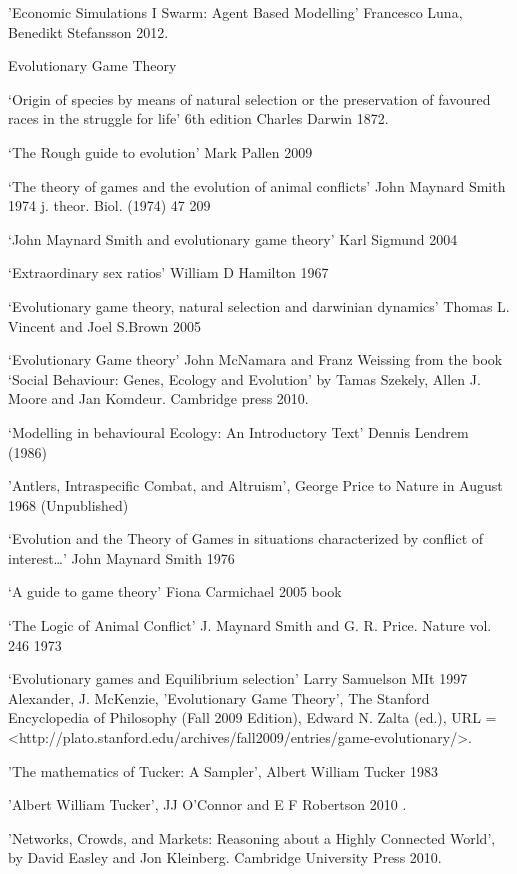 \documentclass{article}
\begin{document}
'Economic Simulations I Swarm: Agent Based Modelling' Francesco Luna, Benedikt Stefansson 2012.


Evolutionary Game Theory

‘Origin of species by means of natural selection or the preservation of favoured races in the struggle for life’ 6th edition Charles
Darwin 1872.

‘The Rough guide to evolution’ Mark Pallen 2009

‘The theory of games and the evolution of animal conflicts’ John Maynard Smith 1974 j. theor. Biol. (1974) 47  209

‘John Maynard Smith and evolutionary game theory’ Karl Sigmund 2004

‘Extraordinary sex ratios’ William D Hamilton 1967

‘Evolutionary game theory, natural selection and darwinian dynamics’ Thomas L. Vincent and Joel S.Brown 2005

‘Evolutionary Game theory’ John McNamara and Franz Weissing from the book ‘Social Behaviour: Genes, Ecology and Evolution’ by
Tamas Szekely, Allen J. Moore and Jan Komdeur. Cambridge press 2010.

‘Modelling in behavioural Ecology: An Introductory Text’ Dennis Lendrem (1986)

 'Antlers, Intraspecific Combat, and Altruism', George Price to Nature in August 1968 (Unpublished)

‘Evolution and the Theory of Games in situations characterized by conflict of interest…’ John Maynard Smith 1976

‘A guide to game theory’ Fiona Carmichael 2005 book

‘The Logic of Animal Conflict' J. Maynard Smith and G. R. Price. Nature vol. 246 1973

‘Evolutionary games and Equilibrium selection’ Larry Samuelson MIt 1997
Alexander, J. McKenzie, 'Evolutionary Game Theory', The Stanford Encyclopedia of Philosophy (Fall 2009 Edition), Edward N. Zalta (ed.), URL = <http://plato.stanford.edu/archives/fall2009/entries/game-evolutionary/>.

'The mathematics of Tucker: A Sampler', Albert William Tucker 1983

'Albert William Tucker', JJ O’Connor and E F Robertson 2010 .

'Networks, Crowds, and Markets: Reasoning about a Highly Connected World', by David Easley and Jon Kleinberg. Cambridge University Press 2010.
\end{document}

